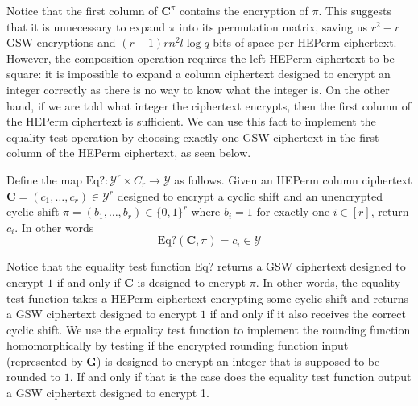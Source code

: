 Notice that the first column of $\mathbf{C}^\pi$ contains the encryption of $\pi$. This suggests that it is unnecessary to expand $\pi$ into its permutation matrix, saving us $r^2 - r$ GSW encryptions and $(r-1)rn^2l \log q$ bits of space per HEPerm ciphertext. However, the composition operation requires the left HEPerm ciphertext to be square: it is impossible to expand a column ciphertext designed to encrypt an integer correctly as there is no way to know what the integer is. On the other hand, if we are told what integer the ciphertext encrypts, then the first column of the HEPerm ciphertext is sufficient. We can use this fact to implement the equality test operation by choosing exactly one GSW ciphertext in the first column of the HEPerm ciphertext, as seen below. 

\begin{definition}
    Define the map $\text{Eq?} \colon \mathcal{Y}^{r} \times C_r \to \mathcal{Y}$ as follows. Given an HEPerm column ciphertext $\mathbf{C} = (c_1, \dots, c_r) \in \mathcal{Y}^r$ designed to encrypt a cyclic shift and an unencrypted cyclic shift $\pi = (b_1, \dots, b_r) \in \{0,1\}^r$ where $b_i = 1$ for exactly one $i \in [r]$, return $c_i$. In other words
    \begin{equation}
        \text{Eq?}(\mathbf{C}, \pi) = c_i \in \mathcal{Y}
    \end{equation}
\end{definition}
Notice that the equality test function $\text{Eq?}$ returns a GSW ciphertext designed to encrypt $1$ if and only if $\mathbf{C}$ is designed to encrypt $\pi$. In other words, the equality test function takes a HEPerm ciphertext encrypting some cyclic shift and returns a GSW ciphertext designed to encrypt $1$ if and only if it also receives the correct cyclic shift. We use the equality test function to implement the rounding function homomorphically by testing if the encrypted rounding function input (represented by $\mathbf{G}$) is designed to encrypt an integer that is supposed to be rounded to $1$. If and only if that is the case does the equality test function output a GSW ciphertext designed to encrypt 1.

